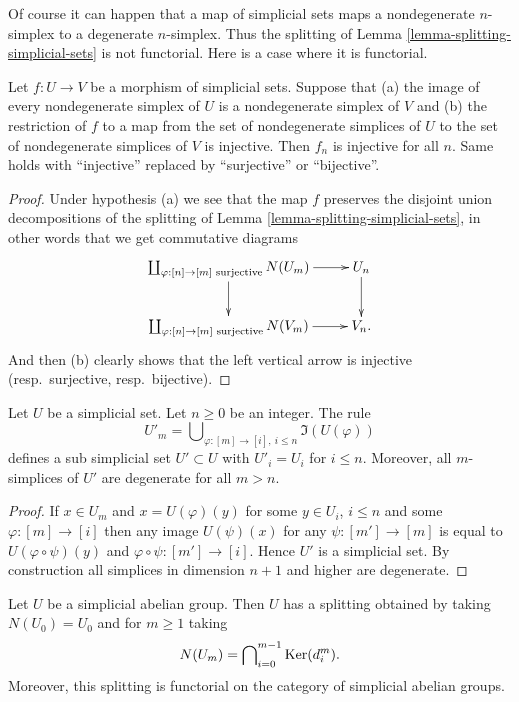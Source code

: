 \noindent
Of course it can happen that a map of simplicial sets
maps a nondegenerate $n$-simplex to a degenerate $n$-simplex.
Thus the splitting of Lemma \ref{lemma-splitting-simplicial-sets}
is not functorial. Here is a case where it is functorial.

\begin{lemma}
\label{lemma-injective-map-simplicial-sets}
Let $f : U \to V$ be a morphism of simplicial sets.
Suppose that (a) the image of every nondegenerate simplex of
$U$ is a nondegenerate simplex of $V$ and (b) the restriction
of $f$ to a map from the set of nondegenerate simplices of $U$
to the set of nondegenerate simplices of $V$ is injective.
Then $f_n$ is injective for all $n$.
Same holds with ``injective'' replaced by
``surjective'' or ``bijective''.
\end{lemma}

\begin{proof}
Under hypothesis (a) we see that the map $f$ preserves
the disjoint union decompositions of the splitting
of Lemma \ref{lemma-splitting-simplicial-sets}, in other words
that we get commutative diagrams
$$
\xymatrix{
\coprod\nolimits_{\varphi : [n] \to [m]\text{ surjective}}
N(U_m)
\ar[r] \ar[d] &
U_n \ar[d] \\
\coprod\nolimits_{\varphi : [n] \to [m]\text{ surjective}}
N(V_m)
\ar[r] &
V_n.
}
$$
And then (b) clearly shows that the left vertical arrow is
injective (resp.\ surjective, resp.\ bijective).
\end{proof}

\begin{lemma}
\label{lemma-simplicial-set-n-skel-sub}
Let $U$ be a simplicial set.
Let $n \geq 0$ be an integer.
The rule
$$
U'_m = \bigcup\nolimits_{\varphi : [m] \to [i], \ i\leq n} \Im(U(\varphi))
$$
defines a sub simplicial set $U' \subset U$ with
$U'_i = U_i$ for $i \leq n$.
Moreover, all $m$-simplices of $U'$ are degenerate for
all $m > n$.
\end{lemma}

\begin{proof}
If $x \in U_m$ and $x = U(\varphi)(y)$
for some $y \in U_i$, $i \leq n$ and some $\varphi : [m] \to [i]$
then any image $U(\psi)(x)$ for any $\psi : [m'] \to [m]$ is
equal to $U(\varphi \circ \psi)(y)$ and $\varphi \circ \psi :
[m'] \to [i]$. Hence $U'$ is a simplicial set. By construction
all simplices in dimension $n + 1$ and higher are degenerate.
\end{proof}

\begin{lemma}
\label{lemma-splitting-simplicial-groups}
Let $U$ be a simplicial abelian group.
Then $U$ has a splitting obtained by taking $N(U_0) = U_0$ and
for $m \geq 1$ taking
$$
N(U_m) = \bigcap\nolimits_{i = 0}^{m - 1} \mathop{\mathrm{Ker}}(d^m_i).
$$
Moreover, this splitting is functorial on the category
of simplicial abelian groups.
\end{lemma}

